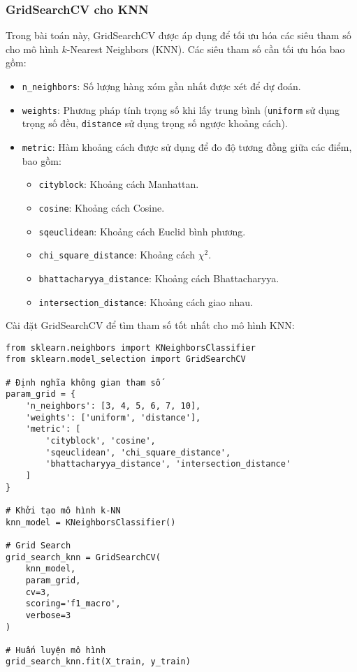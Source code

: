 \documentclass[a4paper,12pt]{article}
\begin{document}
\subsubsection{GridSearchCV cho KNN}  
\hspace{5mm}Trong bài toán này, GridSearchCV được áp dụng để tối ưu hóa các siêu tham số cho mô hình \(k\)-Nearest Neighbors (KNN). Các siêu tham số cần tối ưu hóa bao gồm:  
\begin{itemize}
    \item \texttt{n\_neighbors}: Số lượng hàng xóm gần nhất được xét để dự đoán.
    \item \texttt{weights}: Phương pháp tính trọng số khi lấy trung bình (\texttt{uniform} sử dụng trọng số đều, \texttt{distance} sử dụng trọng số ngược khoảng cách).
    \item \texttt{metric}: Hàm khoảng cách được sử dụng để đo độ tương đồng giữa các điểm, bao gồm:
    \begin{itemize}
        \item \texttt{cityblock}: Khoảng cách Manhattan.
        \item \texttt{cosine}: Khoảng cách Cosine.
        \item \texttt{sqeuclidean}: Khoảng cách Euclid bình phương.
        \item \texttt{chi\_square\_distance}: Khoảng cách \(\chi^2\).
        \item \texttt{bhattacharyya\_distance}: Khoảng cách Bhattacharyya.
        \item \texttt{intersection\_distance}: Khoảng cách giao nhau.
    \end{itemize}
\end{itemize}

Cài đặt GridSearchCV để tìm tham số tốt nhất cho mô hình KNN:

\begin{verbatim}
from sklearn.neighbors import KNeighborsClassifier
from sklearn.model_selection import GridSearchCV

# Định nghĩa không gian tham số
param_grid = {
    'n_neighbors': [3, 4, 5, 6, 7, 10],
    'weights': ['uniform', 'distance'],
    'metric': [
        'cityblock', 'cosine',
        'sqeuclidean', 'chi_square_distance',
        'bhattacharyya_distance', 'intersection_distance'
    ]
}

# Khởi tạo mô hình k-NN
knn_model = KNeighborsClassifier()

# Grid Search
grid_search_knn = GridSearchCV(
    knn_model,
    param_grid,
    cv=3,
    scoring='f1_macro',
    verbose=3 
)

# Huấn luyện mô hình
grid_search_knn.fit(X_train, y_train)
\end{verbatim}
\end{document}
